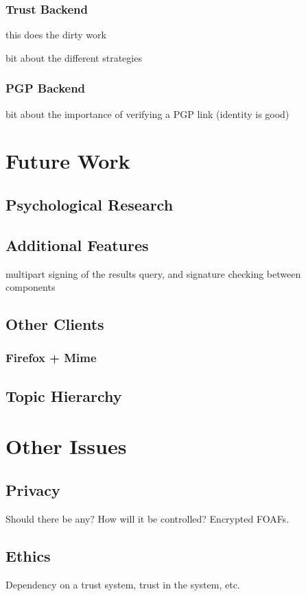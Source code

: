 \documentclass{acm_proc_article-sp}
\begin{document}
\subsubsection{Trust Backend}
this does the dirty work

bit about the different strategies

\subsubsection{PGP Backend}
bit about the importance of verifying a PGP link (identity is good)

\section{Future Work}
\subsection{Psychological Research}
\subsection{Additional Features}
multipart signing of the results query, and signature checking between components
\subsection{Other Clients}
\subsubsection{Firefox + Mime}
\subsection{Topic Hierarchy}
\section{Other Issues}
\subsection{Privacy}
Should there be any?  How will it be controlled?
Encrypted FOAFs.

\subsection{Ethics}
Dependency on a trust system, trust in the system, etc.
\end{document}
